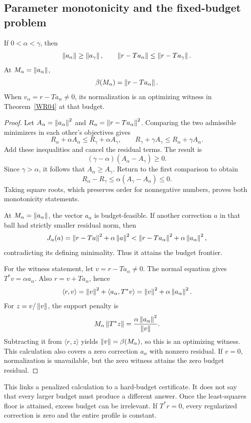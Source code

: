 \subsection{Parameter monotonicity and the fixed-budget problem}
\begin{proposition}\label{WR07}
If $0<\alpha<\gamma$, then
\[
 \left\lVert a_\alpha\right\rVert\ge\left\lVert a_\gamma\right\rVert,\qquad
 \left\lVert r-Ta_\alpha\right\rVert\le\left\lVert r-Ta_\gamma\right\rVert.
\]
At $M_\alpha=\left\lVert a_\alpha\right\rVert$,
\[
 \beta(M_\alpha)=\left\lVert r-Ta_\alpha\right\rVert.
\]
When $v_\alpha=r-Ta_\alpha\ne0$, its normalization is an optimizing witness in Theorem~\ref{WR04} at that budget.
\end{proposition}
\begin{proof}
Let $A_\alpha=\left\lVert a_\alpha\right\rVert^2$ and $R_\alpha=\left\lVert r-Ta_\alpha\right\rVert^2$. Comparing the two admissible minimizers in each other's objectives gives
\[
 R_\alpha+\alpha A_\alpha\le R_\gamma+\alpha A_\gamma,
 \qquad R_\gamma+\gamma A_\gamma\le R_\alpha+\gamma A_\alpha.
\]
Add these inequalities and cancel the residual terms. The result is
\[
 (\gamma-\alpha)(A_\alpha-A_\gamma)\ge0.
\]
Since $\gamma>\alpha$, it follows that $A_\alpha\ge A_\gamma$. Return to the first comparison to obtain
\[
 R_\alpha-R_\gamma\le\alpha(A_\gamma-A_\alpha)\le0.
\]
Taking square roots, which preserves order for nonnegative numbers, proves both monotonicity statements.

At $M_\alpha=\left\lVert a_\alpha\right\rVert$, the vector $a_\alpha$ is budget-feasible. If another correction $a$ in that ball had strictly smaller residual norm, then
\[
 J_\alpha(a)
 =\left\lVert r-Ta\right\rVert^2+\alpha\left\lVert a\right\rVert^2
 <\left\lVert r-Ta_\alpha\right\rVert^2+\alpha\left\lVert a_\alpha\right\rVert^2,
\]
contradicting its defining minimality. Thus it attains the budget frontier.

For the witness statement, let $v=r-Ta_\alpha\ne0$. The normal equation gives $T^*v=\alpha a_\alpha$. Also $r=v+Ta_\alpha$, hence
\[
 \langle r,v\rangle
 =\left\lVert v\right\rVert^2+\langle a_\alpha,T^*v\rangle
 =\left\lVert v\right\rVert^2+\alpha\left\lVert a_\alpha\right\rVert^2.
\]
For $z=v/\left\lVert v\right\rVert$, the support penalty is
\[
 M_\alpha\left\lVert T^*z\right\rVert
 =\frac{\alpha\left\lVert a_\alpha\right\rVert^2}{\left\lVert v\right\rVert}.
\]
Subtracting it from $\langle r,z\rangle$ yields $\left\lVert v\right\rVert=\beta(M_\alpha)$, so this is an optimizing witness. This calculation also covers a zero correction $a_\alpha$ with nonzero residual. If $v=0$, normalization is unavailable, but the zero witness attains the zero budget residual.
\end{proof}

This links a penalized calculation to a hard-budget certificate. It does not say that every larger budget must produce a different answer. Once the least-squares floor is attained, excess budget can be irrelevant. If $T^*r=0$, every regularized correction is zero and the entire profile is constant.

